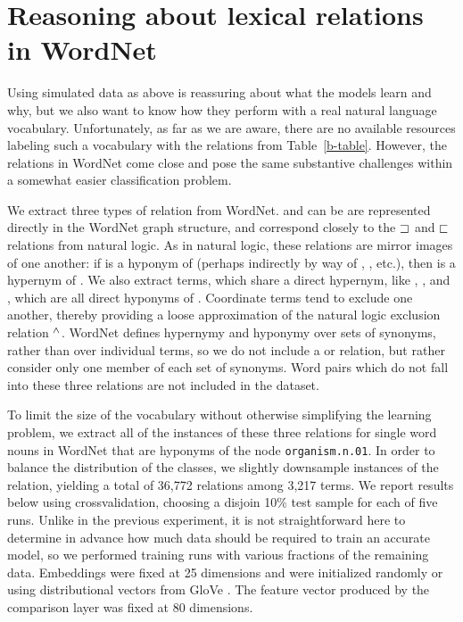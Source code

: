 \section{Reasoning about lexical relations in WordNet}\label{sec:wordnet}

Using simulated data as above is reassuring about what the models
learn and why, but we also want to know how they perform with a real
natural language vocabulary. Unfortunately, as far as we are aware,
there are no available resources labeling such a vocabulary with the
relations from Table~\ref{b-table}. However, the relations in WordNet
\cite{fellbaum2010wordnet} come close and pose the same substantive
challenges within a somewhat easier classification problem.


We extract three types of relation from WordNet.  and
 can be are represented directly in the WordNet graph
structure, and correspond closely to the $\sqsupset$ and $\sqsubset$
relations from natural logic. As in natural logic, these relations are
mirror images of one another: if  is a hyponym of 
(perhaps indirectly by way of , , etc.), then
 is a hypernym of . We also extract 
terms, which share a direct hypernym, like , ,
and , which are all direct hyponyms of .  Coordinate
terms tend to exclude one another, thereby providing a loose approximation 
of the natural logic exclusion relation $\mathbin{^{\wedge}}$. 
WordNet defines hypernymy and hyponymy over
sets of synonyms, rather than over individual terms, so we do not
include a  or  relation, but rather
consider only one member of each set of synonyms. Word pairs which do
not fall into these three relations are not included in the dataset.

To limit the size of the vocabulary without otherwise simplifying the learning problem, we extract all of the
instances of these three relations for single word nouns in WordNet that are hyponyms of the node 
\texttt{organism.n.01}. In order to balance the distribution of the classes, we slightly downsample instances 
of the  relation, yielding a total of 36,772 relations among 3,217 terms. We report results below using crossvalidation, choosing a disjoin 10\% test sample for each of five runs. Unlike in the previous experiment,
it is not straightforward here to determine in advance
how much data should be required to train an accurate model, so we performed training runs with 
various fractions of the remaining data. Embeddings were fixed at 25 dimensions and were initialized 
randomly or using distributional vectors from GloVe \cite{pennington2014glove}. The feature vector 
produced by the comparison layer was fixed at 80 dimensions.

